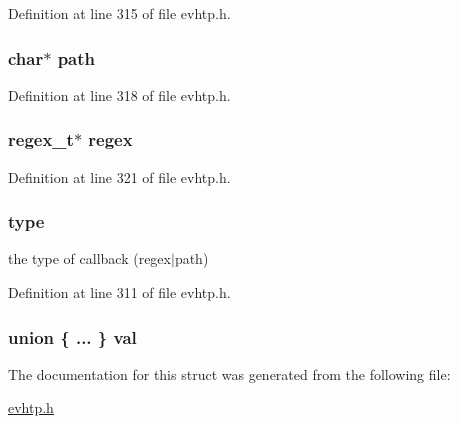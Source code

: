\-Definition at line 315 of file evhtp.\-h.

\hypertarget{structevhtp__callback__s_a44196e6a5696d10442c29e639437196e}{
\subsubsection[{path}]{\setlength{\rightskip}{0pt plus 5cm}char$\ast$ {\bf path}}}\label{structevhtp__callback__s_a44196e6a5696d10442c29e639437196e}


\-Definition at line 318 of file evhtp.\-h.

\hypertarget{structevhtp__callback__s_af71a3fad7fee5d731252ce89e56f948f}{
\subsubsection[{regex}]{\setlength{\rightskip}{0pt plus 5cm}regex\-\_\-t$\ast$ {\bf regex}}}\label{structevhtp__callback__s_af71a3fad7fee5d731252ce89e56f948f}


\-Definition at line 321 of file evhtp.\-h.

\hypertarget{structevhtp__callback__s_a6da94264a51bd354aca3d22098a2aee5}{
\subsubsection[{type}]{ {\bf type}}}\label{structevhtp__callback__s_a6da94264a51bd354aca3d22098a2aee5}
the type of callback (regex$|$path) 

\-Definition at line 311 of file evhtp.\-h.

\hypertarget{structevhtp__callback__s_a46fe687f5d6aa04ca3260318f08188b4}{
\subsubsection[{val}]{\setlength{\rightskip}{0pt plus 5cm}union \{ ... \}   {\bf val}}}\label{structevhtp__callback__s_a46fe687f5d6aa04ca3260318f08188b4}


\-The documentation for this struct was generated from the following file\-:\begin{DoxyCompactItemize}
\item 
\hyperlink{evhtp_8h}{evhtp.\-h}\end{DoxyCompactItemize}
